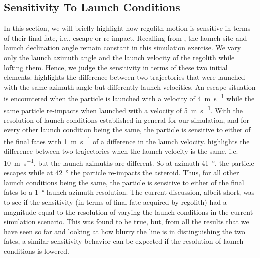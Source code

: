 \subsection{Sensitivity To Launch Conditions}
\label{subsec:sensitivity_noSP}
In this section, we will briefly highlight how regolith motion is sensitive in terms of their final fate, i.e., escape or re-impact. Recalling from , the launch site and launch declination angle remain constant in this simulation exercise. We vary only the launch azimuth angle and the launch velocity of the regolith while lofting them. Hence, we judge the sensitivity in terms of these two initial elements.
%
\newline\newline
%
 highlights the difference between two trajectories that were launched with the same azimuth angle but differently launch velocities. An escape situation is encountered when the particle is launched with a velocity of \SI{4}{\metre\per\second} while the same particle re-impacts when launched with a velocity of \SI{5}{\metre\per\second}. With the resolution of launch conditions established in general for our simulation, and for every other launch condition being the same, the particle is sensitive to either of the final fates with \SI{1}{\metre\per\second} of a difference in the launch velocity.
%
\newline\newline
%
 highlights the difference between two trajectories when the launch velocity is the same, i.e. \SI{10}{\metre\per\second}, but the launch azimuths are different. So at azimuth \SI{41}{\degree}, the particle escapes while at \SI{42}{\degree} the particle re-impacts the asteroid. Thus, for all other launch conditions being the same, the particle is sensitive to either of the final fates to a \SI{1}{\degree} launch azimuth resolution.
%
\newline\newline
%
The current discussion, albeit short, was to see if the sensitivity (in terms of final fate acquired by regolith) had a magnitude equal to the resolution of varying the launch conditions in the current simulation scenario. This was found to be true, but, from all the results that we have seen so far and looking at how blurry the line is in distinguishing the two fates, a similar sensitivity behavior can be expected if the resolution of launch conditions is lowered.
